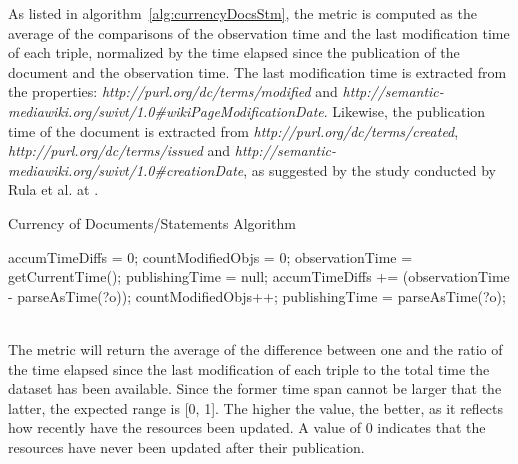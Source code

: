 As listed in algorithm~\ref{alg:currencyDocsStm}, the metric is computed as the average of the comparisons of the observation time and the last modification time of each triple, normalized by the time elapsed since the publication of the document and the observation time. The last modification time is extracted from the properties: \textit{http://purl.org/dc/terms/modified} and \textit{http://semantic-mediawiki.org/swivt/1.0\#wikiPageModificationDate}. Likewise, the publication time of the document is extracted from \textit{http://purl.org/dc/terms/created}, \textit{http://purl.org/dc/terms/issued} and \textit{http://semantic-mediawiki.org/swivt/1.0\#creationDate}, as suggested by the study conducted by Rula et al. at \cite{Rula2012}.
\begin{algorithm}
\caption{Currency of Documents/Statements Algorithm} \label{alg:currencyDocsStm}
\begin{algorithmic}[1]
\State accumTimeDiffs = 0;
\State countModifiedObjs = 0;
\State observationTime = getCurrentTime();
\State publishingTime = null;
\EndProcedure
{}
\State accumTimeDiffs += (observationTime - parseAsTime(?o));
\State countModifiedObjs++;
\EndIf
{} 
\State publishingTime = parseAsTime(?o);
\EndIf ~\\
\EndProcedure
\end{algorithmic}
\end{algorithm}
The metric will return the average of the difference between one and the ratio of the time elapsed since the last modification of each triple to the total time the dataset has been available. Since the former time span cannot be larger that the latter, the expected range is [0, 1]. The higher the value, the better, as it reflects how recently have the resources been updated. A value of 0 indicates that the resources have never been updated after their publication.



